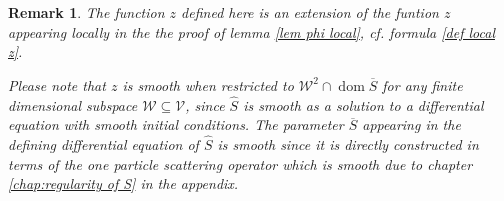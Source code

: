 \documentclass[b5paper,draft,openbib,12pt]{memoir}
\newtheorem{Remark}[Def]{Remark}
\DeclareMathOperator{\dom}{dom}
\begin{document}
\begin{Remark}
The function \(z\) defined here is an extension 
of the funtion \(z\) appearing locally 
in the 
the proof of lemma \ref{lem phi local},
cf. formula \eqref{def local z}.

Please note that \(z\) is smooth
when restricted to  \(\mathcal{W}^2\cap \dom\overline{S}\) 
for any finite dimensional subspace
\(\mathcal{W}\subseteq \mathcal{V}\), since 
\(\hat{S}\) is smooth as a solution to a differential 
equation with smooth initial conditions. 
The parameter \(\overline{S}\) appearing in the defining 
differential equation of \(\hat{S}\) is smooth 
since it is directly constructed in terms of 
the one particle scattering operator which is smooth 
due to chapter \ref{chap:regularity of S} in the
appendix.
\end{Remark}
\end{document}
